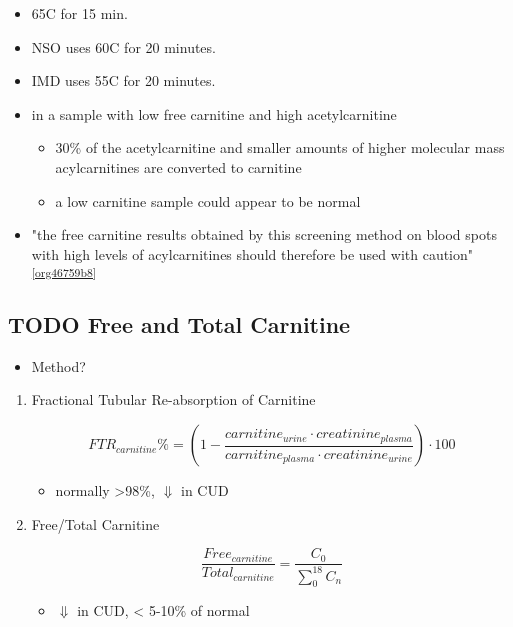 \documentclass{scrartcl}
\begin{document}
\begin{enumerate}
\begin{itemize}
\item 65\degree{}C for 15 min.
\item NSO uses 60\degree{}C for 20 minutes.
\item IMD uses 55\degree{}C for 20 minutes.

\item in a sample with low free carnitine and high acetylcarnitine
\begin{itemize}
\item 30\% of the acetylcarnitine and smaller amounts of higher
molecular mass acylcarnitines are converted to carnitine
\item a low carnitine sample could appear to be normal
\end{itemize}
\item "the free carnitine results obtained by this screening method on
blood spots with high levels of acylcarnitines should therefore be
used with caution" \textsuperscript{\ref{org46759b8}}
\end{itemize}
\end{enumerate}


\subsection{{\bfseries\sffamily TODO} Free and Total Carnitine}
\label{sec:org1f3e988}
\begin{itemize}
\item Method?
\end{itemize}
\begin{enumerate}
\item Fractional Tubular Re-absorption of Carnitine
\label{sec:org5b0d73c}

\begin{equation*}
FTR_{carnitine}\% = \left( 1 -  \frac{carnitine_{urine} \cdot creatinine_{plasma}}{carnitine_{plasma} \cdot creatinine_{urine}}\right) \cdot 100
\end{equation*}

\begin{itemize}
\item normally >98\%, \(\Downarrow\) in CUD
\end{itemize}

\item Free/Total Carnitine
\label{sec:orgcc82667}

\[
\frac{Free_{carnitine}}{Total_{carnitine}} = \frac{C_0}{\sum_{0}^{18} C_n}
\]

\begin{itemize}
\item \(\Downarrow\) in CUD, < 5-10\% of normal
\end{itemize}
\end{enumerate}
\end{document}
